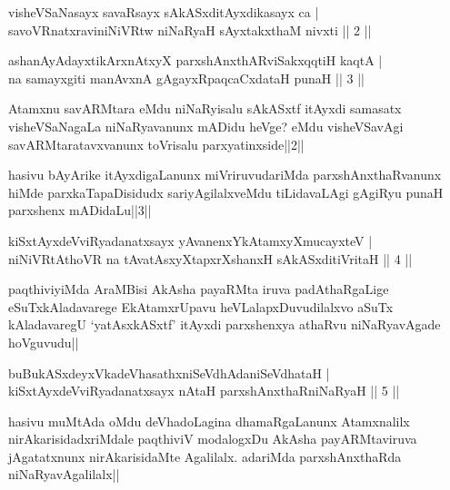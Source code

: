 \begin{shl}
visheVSaNasayx savaRsayx sAkASxditAyxdikasayx ca |\\
savoVRnatxraviniNiVRtw niNaRyaH sAyxtakxthaM nivxti \hfill || 2 ||
\end{shl}

\begin{shl}
ashanAyAdayxtikArxnAtxyX parxshAnxthARviSakxqqtiH kaqtA |\\
na samayxgiti manAvxnA gAgayxRpaqcaCxdataH punaH \hfill || 3 ||
\end{shl}

\begin{artha}
Atamxnu savARMtara eMdu niNaRyisalu sAkASxtf itAyxdi samasatx visheVSaNagaLa niNaRyavanunx mADidu heVge? eMdu visheVSavAgi savARMtaratavxvanunx toVrisalu parxyatinxside||2||

hasivu bAyArike itAyxdigaLanunx miVriruvudariMda parxshAnxthaRvanunx hiMde parxkaTapaDisidudx sariyAgilalxveMdu tiLidavaLAgi gAgiRyu punaH parxshenx mADidaLu||3||
\end{artha}


\begin{shl}
kiSxtAyxdeVviRyadanatxsayx yAvanenxYkAtamxyXmucayxteV |\\
niNiVRtAthoVR na tAvatAsxyXtapxrXshanxH sAkASxditiVritaH \hfill || 4 ||
\end{shl}

\begin{artha}
paqthiviyiMda AraMBisi AkAsha payaRMta iruva padAthaRgaLige eSuTxkAladavarege EkAtamxrUpavu heVLalapxDuvudilalxvo aSuTx kAladavaregU `yatAsxkASxtf' itAyxdi parxshenxya athaRvu niNaRyavAgade hoVguvudu||
\end{artha}

\begin{shl}
buBukASxdeyxVkadeVhasathxniSeVdhAdaniSeVdhataH |\\
kiSxtAyxdeVviRyadanatxsayx nAtaH parxshAnxthaRniNaRyaH \hfill || 5 ||
\end{shl}

\begin{artha}%
hasivu muMtAda oMdu deVhadoLagina dhamaRgaLanunx Atamxnalilx nirAkarisidadxriMdale paqthiviV modalogxDu AkAsha payARMtaviruva jAgatatxnunx nirAkarisidaMte Agalilalx. adariMda parxshAnxthaRda niNaRyavAgalilalx||
\end{artha}


